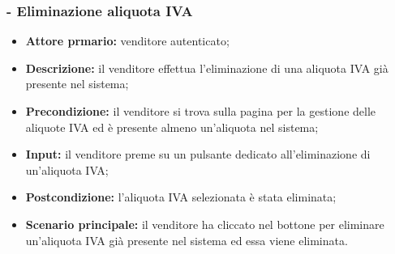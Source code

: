 \stepsubUserCase
\subsubsection{- Eliminazione aliquota IVA}
\begin{itemize}
    \item \textbf{Attore prmario:} venditore autenticato;
    \item \textbf{Descrizione:} il venditore effettua l'eliminazione di una aliquota IVA già presente nel sistema;
    \item \textbf{Precondizione:} il venditore si trova sulla pagina per la gestione delle aliquote IVA ed è presente almeno un'aliquota nel sistema;
    \item \textbf{Input:} il venditore preme su un pulsante dedicato all'eliminazione di un'aliquota IVA;
    \item \textbf{Postcondizione:} l'aliquota IVA selezionata è stata eliminata;
    \item \textbf{Scenario principale:} il venditore ha cliccato nel bottone per eliminare un’aliquota IVA già presente nel sistema ed essa viene eliminata.
\end{itemize}

\stepUserCase
